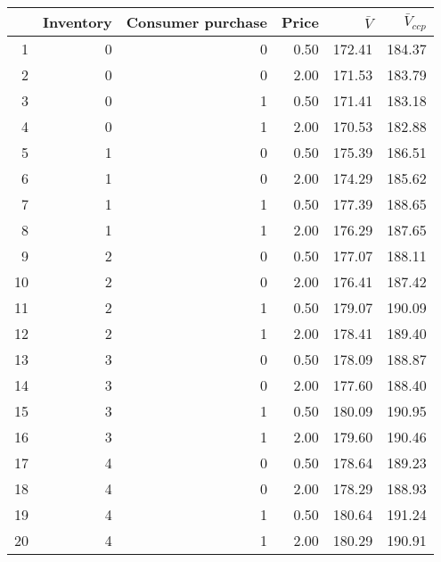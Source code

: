 \begin{tabular}{rrrrrr}
  \hline
 & Inventory & Consumer purchase & Price & $\bar{V}$ & $\bar{V}_{ccp}$ \\ 
  \hline
1 &   0 &   0 & 0.50 & 172.41 & 184.37 \\ 
  2 &   0 &   0 & 2.00 & 171.53 & 183.79 \\ 
  3 &   0 &   1 & 0.50 & 171.41 & 183.18 \\ 
  4 &   0 &   1 & 2.00 & 170.53 & 182.88 \\ 
  5 &   1 &   0 & 0.50 & 175.39 & 186.51 \\ 
  6 &   1 &   0 & 2.00 & 174.29 & 185.62 \\ 
  7 &   1 &   1 & 0.50 & 177.39 & 188.65 \\ 
  8 &   1 &   1 & 2.00 & 176.29 & 187.65 \\ 
  9 &   2 &   0 & 0.50 & 177.07 & 188.11 \\ 
  10 &   2 &   0 & 2.00 & 176.41 & 187.42 \\ 
  11 &   2 &   1 & 0.50 & 179.07 & 190.09 \\ 
  12 &   2 &   1 & 2.00 & 178.41 & 189.40 \\ 
  13 &   3 &   0 & 0.50 & 178.09 & 188.87 \\ 
  14 &   3 &   0 & 2.00 & 177.60 & 188.40 \\ 
  15 &   3 &   1 & 0.50 & 180.09 & 190.95 \\ 
  16 &   3 &   1 & 2.00 & 179.60 & 190.46 \\ 
  17 &   4 &   0 & 0.50 & 178.64 & 189.23 \\ 
  18 &   4 &   0 & 2.00 & 178.29 & 188.93 \\ 
  19 &   4 &   1 & 0.50 & 180.64 & 191.24 \\ 
  20 &   4 &   1 & 2.00 & 180.29 & 190.91 \\ 
   \hline
\end{tabular}

